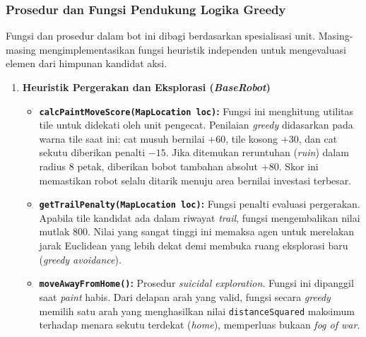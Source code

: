 \subsubsection{Prosedur dan Fungsi Pendukung Logika Greedy}

Fungsi dan prosedur dalam bot ini dibagi berdasarkan spesialisasi unit. Masing-masing mengimplementasikan fungsi heuristik independen untuk mengevaluasi elemen dari himpunan kandidat aksi.

\begin{enumerate}
    \item \textbf{Heuristik Pergerakan dan Eksplorasi (\textit{BaseRobot})}
    \begin{itemize}
        \item \textbf{\texttt{calcPaintMoveScore(MapLocation loc)}:} Fungsi ini menghitung utilitas tile untuk didekati oleh unit pengecat. Penilaian \textit{greedy} didasarkan pada warna tile saat ini: cat musuh bernilai $+60$, tile kosong $+30$, dan cat sekutu diberikan penalti $-15$. Jika ditemukan reruntuhan (\textit{ruin}) dalam radius 8 petak, diberikan bobot tambahan absolut $+80$. Skor ini memastikan robot selalu ditarik menuju area bernilai investasi terbesar.
        \item \textbf{\texttt{getTrailPenalty(MapLocation loc)}:} Fungsi penalti evaluasi pergerakan. Apabila tile kandidat ada dalam riwayat \textit{trail}, fungsi mengembalikan nilai mutlak 800. Nilai yang sangat tinggi ini memaksa agen untuk merelakan jarak Euclidean yang lebih dekat demi membuka ruang eksplorasi baru (\textit{greedy avoidance}).
        \item \textbf{\texttt{moveAwayFromHome()}:} Prosedur \textit{suicidal exploration}. Fungsi ini dipanggil saat \textit{paint} habis. Dari delapan arah yang valid, fungsi secara \textit{greedy} memilih satu arah yang menghasilkan nilai \texttt{distanceSquared} maksimum terhadap menara sekutu terdekat (\textit{home}), memperluas bukaan \textit{fog of war}.
    \end{itemize}


\end{enumerate}
